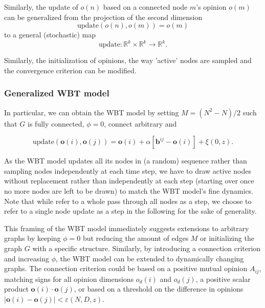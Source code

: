 \documentclass[11pt]{article}
\begin{document}
Similarly, the update of $o(n)$ based on a connected node $m$'s opinion $o(m)$ can be generalized from the projection of the second dimension \[\text{update}(o(n),o(m))=o(m)\] to a general (stochastic) map 
\[
\text{update}:\mathbb{R}^{k}\times\mathbb{R}^{k}\to \mathbb{R}^k.
\] 

Similarly, the initialization of opinions, the way 'active' nodes are sampled and the convergence criterion can be modified. 
\subsubsection{Generalized WBT model}

In particular, we can obtain the WBT model by setting $M={(N^2-N)}/{2}$ such that $G$ is fully connected, $\phi=0$, $\text{connect}$ arbitrary and


\[
\text{update}(\mathbf{o}(i),\mathbf{o}(j)) =  \mathbf{o}(i) + \alpha \left[\mathbf{b}^{ij}-\mathbf{o}(i)\right]+\xi(0,z).
\]

As the WBT model updates all its nodes in (a random) sequence rather than sampling nodes independently at each time step, we have to draw active nodes without replacement rather than independently at each step (starting over once no more nodes are left to be drawn) to match the WBT model's fine dynamics. Note that while \citet{schweighofer2020} refer to a whole pass through all nodes as a step, we choose to refer to a single node update as a step in the following for the sake of generality. 


This framing of the WBT model immediately suggests extensions to arbitrary graphs by keeping $\phi=0$ but reducing the amount of edges $M$ or initializing the graph $G$ with a specific structure. Similarly, by introducing a connection criterion and increasing $\phi$, the WBT model can be extended to dynamically changing graphs. The connection criterion could be based on a positive mutual opinion $A_{ij}$, matching signs for all opinion dimensions $o_d(i)$ and $o_{d}(j)$, a positive scalar product $\mathbf{o}(i)\cdot \mathbf{o}(j)$, or based on a threshold on the difference in opinions $|\mathbf{o}(i) - \mathbf{o}(j)| < \varepsilon(N,D,z)$. 
\end{document}
